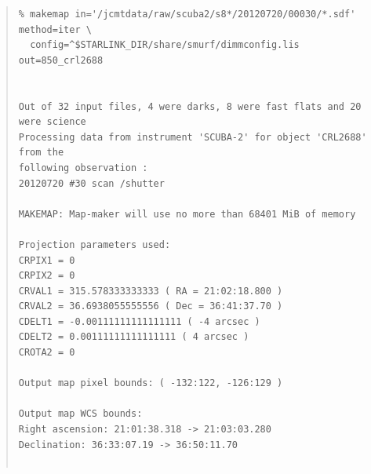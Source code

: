 \documentclass[twoside,11pt]{article}
\renewcommand{\_}{\texttt{\symbol{95}}}
\newenvironment{myquote}{\begin{quote}\begin{small}}{\end{small}\end{quote}}
\begin{document}
\begin{myquote}
\begin{verbatim}
% makemap in='/jcmtdata/raw/scuba2/s8*/20120720/00030/*.sdf' method=iter \
  config=^$STARLINK_DIR/share/smurf/dimmconfig.lis out=850_crl2688


Out of 32 input files, 4 were darks, 8 were fast flats and 20 were science
Processing data from instrument 'SCUBA-2' for object 'CRL2688' from the
following observation :
20120720 #30 scan /shutter

MAKEMAP: Map-maker will use no more than 68401 MiB of memory

Projection parameters used:
CRPIX1 = 0
CRPIX2 = 0
CRVAL1 = 315.578333333333 ( RA = 21:02:18.800 )
CRVAL2 = 36.6938055555556 ( Dec = 36:41:37.70 )
CDELT1 = -0.00111111111111111 ( -4 arcsec )
CDELT2 = 0.00111111111111111 ( 4 arcsec )
CROTA2 = 0

Output map pixel bounds: ( -132:122, -126:129 )

Output map WCS bounds:
Right ascension: 21:01:38.318 -> 21:03:03.280
Declination: 36:33:07.19 -> 36:50:11.70


\end{verbatim}
\end{myquote}
\end{document}
